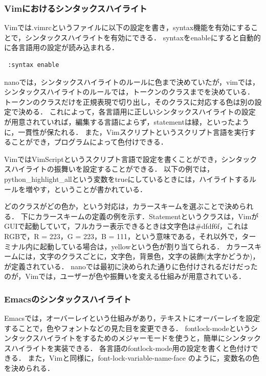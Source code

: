 \documentclass{cs-thesis}
\begin{document}
  \subsubsection{Vimにおけるシンタックスハイライト}
  Vim\cite{bib:vim}では.vimrcというファイルに以下の設定を書き，syntax機能を有効にすることで，シンタックスハイライトを有効にできる．
  syntaxをenableにすると自動的に各言語用の設定が読み込まれる．

\begin{framed}
\begin{verbatim}
 :syntax enable
\end{verbatim}
\end{framed}

  nanoでは，シンタックスハイライトのルールに色まで決めていたが，vimでは，シンタックスハイライトのルールでは，トークンのクラスまでを決めている．
  トークンのクラスだけを正規表現で切り出し，そのクラスに対応する色は別の設定で決める．
  これによって，各言語用に正しいシンタックスハイライトの設定が用意されていれば，編集する言語によらず，statementは緑，といったように，一貫性が保たれる．
  また，Vimスクリプトというスクリプト言語を実行することができ，プログラムによって色付けできる．

  VimではVimScriptというスクリプト言語で設定を書くことができ，シンタックスハイライトの振舞いを設定することができる．
  以下の例では，python\_highlight\_allという変数をtrueにしているときには，ハイライトするルールを増やす，ということが書かれている．

  

  どのクラスがどの色か，という対応は，カラースキームを選ぶことで決められる．
  下にカラースキームの定義の例を示す．Statementというクラスは，VimがGUIで起動していて，フルカラー表示できるときは文字色は\#dfdf6f，これはRGBで，R = 223，G = 223，B = 111，という意味である，それ以外で，ターミナル内に起動している場合は，yellowという色が割り当てられる．
  カラースキームには，文字のクラスごとに，文字色，背景色，文字の装飾(太字かどうか)，が定義されている．
  nanoでは最初に決められた通りに色付けされるだけだったのが，Vimでは，ユーザーが色や振舞いを変える仕組みが用意されている．

  

  \subsubsection{Emacsのシンタックスハイライト}
  Emacs\cite{bib:emacs}では，オーバーレイという仕組みがあり，テキストにオーバーレイを設定することで，色やフォントなどの見た目を変更できる．
  fontlock-modeというシンタックスハイライトをするためのメジャーモードを使うと，簡単にシンタックスハイライトを実装できる\cite{bib:emacs-oreilly}．
  各言語のfontlock-mode用の設定を書くと色付けできる．
  また，Vimと同様に，font-lock-variable-name-face のように，変数名の色を決められる．
\end{document}
